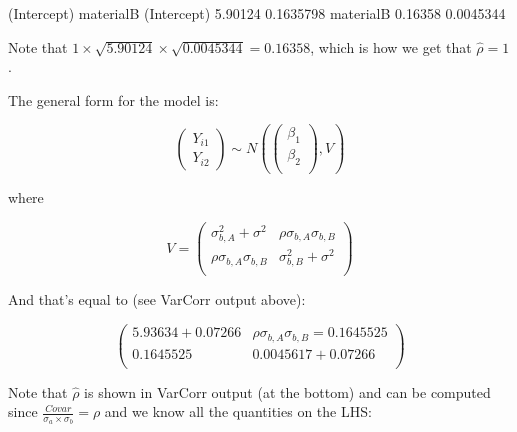 \documentclass[10pt,landscape]{article}
\begin{document}
\begin{multicols}{3}
\begin{Schunk}
\begin{Soutput}
            (Intercept) materialB
(Intercept)     5.90124 0.1635798
materialB       0.16358 0.0045344
\end{Soutput}
\end{Schunk}

Note that $1\times {}\times {}=0.16358$, which is how we get that $\hat{\rho}=1$.

The general form for the model is:

\begin{equation}
\begin{pmatrix}
Y_{i1}\\
Y_{i2}
\end{pmatrix}
\sim
N\left( 
\begin{pmatrix}
\beta_1\\
\beta_2\\
\end{pmatrix}
,
V
\right)
\end{equation}

where 

\begin{equation}
V =
\begin{pmatrix}
\sigma^2_{b,A} + \sigma^2  &  \rho\sigma_{b,A}\sigma_{b,B}\\
\rho\sigma_{b,A}\sigma_{b,B} & \sigma^2_{b,B}+\sigma^2  \\       
\end{pmatrix}
\end{equation}

And that's equal to (see VarCorr output above):


\begin{equation}
\begin{pmatrix}
5.93634+0.07266  & \rho\sigma_{b,A}\sigma_{b,B}=0.1645525\\
 0.1645525 & 0.0045617+ 0.07266\\
\end{pmatrix}
\end{equation}


Note that $\hat{\rho}$ is shown in VarCorr output (at the bottom) and can be computed since $=\rho$ and we know all the quantities on the LHS:


\end{multicols}
\end{document}

